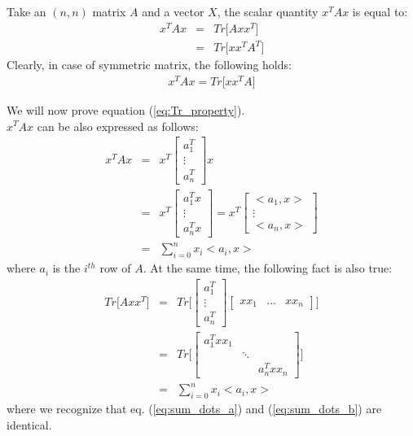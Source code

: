 \documentclass{article}
\begin{document}
Take an $(n,n)$ matrix $A$ and a vector $X$, the scalar quantity $x^T A x$ is equal to:
\begin{eqnarray}
x^T A x &=& Tr \bigg [ 
A xx^T
\bigg ]
\label{eq:Tr_property}
\\
&=& Tr \bigg [ 
xx^T A^T
\bigg ]
\end{eqnarray}
Clearly, in case of symmetric matrix, the following holds:
\begin{eqnarray}
x^T A x = Tr \bigg [ 
xx^T A
\bigg ]
\end{eqnarray}

We will now prove equation (\ref{eq:Tr_property}).
\\
$x^T A x$ can be also expressed as follows:
\begin{eqnarray}
x^T A x &=& x^T \begin{bmatrix} 
a_1^T \\
\vdots \\ 
a_n^T
\end{bmatrix} x \\
&=&
x^T \begin{bmatrix} 
a_1^T x \\
\vdots \\ 
a_n^T x
\end{bmatrix} = x^T \begin{bmatrix} 
<a_1, x> \\
\vdots \\ 
<a_n, x>
\end{bmatrix} \\
&=&
\sum_{i = 0}^n x_i <a_i, x>
\label{eq:sum_dots_a}
\end{eqnarray}
where $a_i$ is the $i^{th}$ row of $A$.
At the same time, the following fact is also true:
\begin{eqnarray}
Tr \bigg [ A x x^T \bigg ] &=& 
Tr \bigg [
\begin{bmatrix} a_1^T \\ \vdots \\ a_n^T \end{bmatrix}
\begin{bmatrix} xx_1 & \hdots & xx_n \end{bmatrix}
\bigg ]  \\
&=&
Tr \bigg [
\begin{bmatrix} 
a_1^T xx_1 & & \\
& \ddots & \\
& & a_n^T xx_n
\end{bmatrix}
\bigg ] \\
&=&
\sum_{i = 0}^n x_i <a_i, x>
\label{eq:sum_dots_b}
\end{eqnarray}
where we recognize that eq. (\ref{eq:sum_dots_a}) and (\ref{eq:sum_dots_b}) are identical.



\end{document}
